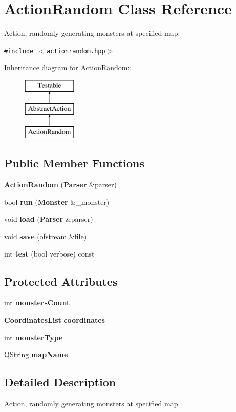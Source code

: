 \section{Action\-Random Class Reference}
\label{classActionRandom}
Action, randomly generating monsters at specified map.  


{\tt \#include $<$actionrandom.hpp$>$}

Inheritance diagram for Action\-Random::\begin{figure}[H]
\begin{center}
\leavevmode
\includegraphics[height=3cm]{classActionRandom}
\end{center}
\end{figure}
\subsection*{Public Member Functions}
\begin{CompactItemize}
\item 
{\bf Action\-Random} ({\bf Parser} \&parser)
\item 
bool {\bf run} ({\bf Monster} \&\_\-monster)
\item 
void {\bf load} ({\bf Parser} \&parser)
\item 
void {\bf save} (ofstream \&file)
\item 
int {\bf test} (bool verbose) const 
\end{CompactItemize}
\subsection*{Protected Attributes}
\begin{CompactItemize}
\item 
int {\bf monsters\-Count}
\item 
{\bf Coordinates\-List} {\bf coordinates}
\item 
int {\bf monster\-Type}
\item 
QString {\bf map\-Name}
\end{CompactItemize}


\subsection{Detailed Description}
Action, randomly generating monsters at specified map. 



